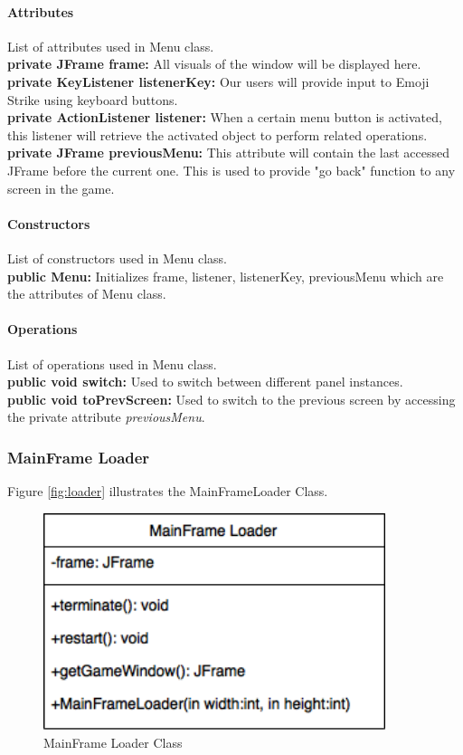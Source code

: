 \documentclass[12pt]{article} %
\begin{document}
\paragraph{Attributes \\}

List of attributes used in Menu class.\\
\textbf{private JFrame frame:} All visuals of the window will be displayed here.\\
\textbf{private KeyListener listenerKey:} Our users will provide input to Emoji Strike using keyboard buttons. \\
\textbf{private ActionListener listener:} When a certain menu button is activated, this listener will retrieve the activated object to perform related operations.\\
\textbf{private JFrame previousMenu:} This attribute will contain the last accessed JFrame before the current one.  This is used to provide "go back" function to any screen in the game.

\paragraph{Constructors \\}
List of constructors used in Menu class.\\
\textbf{public Menu:} Initializes frame, listener, listenerKey, previousMenu which are the attributes of Menu class.

\paragraph{Operations \\}
List of operations used in Menu class.\\
\textbf{public void switch:} Used to switch between different panel instances.\\
\textbf{public void toPrevScreen:} Used to switch to the previous screen by accessing the private attribute \textit{previousMenu}.

\subsubsection{MainFrame Loader}

Figure \ref{fig:loader} illustrates the MainFrameLoader Class.
\begin{figure}[h!]
   \centering
   \vspace{10pt}%
   \includegraphics[width=10cm]{loader.png}
   \caption{MainFrame Loader Class}
   \label{fig:mainframeloader}
\end{figure}
\end{document}
